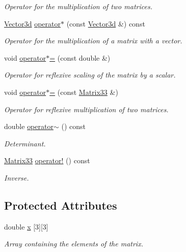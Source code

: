 \begin{DoxyCompactItemize}
\begin{DoxyCompactList}\small\item\em \-Operator for the multiplication of two matrices. \end{DoxyCompactList}\item 
\hyperlink{classVector3d}{\-Vector3d} \hyperlink{classMatrix33_a601584a1edbaae7c6a2a2874605d6f61}{operator$\ast$} (const \hyperlink{classVector3d}{\-Vector3d} \&) const 
\begin{DoxyCompactList}\small\item\em \-Operator for the multiplication of a matrix with a vector. \end{DoxyCompactList}\item 
void \hyperlink{classMatrix33_a83162791813bef030b1ceb5df3c5cae3}{operator$\ast$=} (const double \&)
\begin{DoxyCompactList}\small\item\em \-Operator for reflexive scaling of the matrix by a scalar. \end{DoxyCompactList}\item 
void \hyperlink{classMatrix33_ac3937bdeb034cc83b4adcad16cd58a26}{operator$\ast$=} (const \hyperlink{classMatrix33}{\-Matrix33} \&)
\begin{DoxyCompactList}\small\item\em \-Operator for reflexive multiplication of two matrices. \end{DoxyCompactList}\item 
double \hyperlink{classMatrix33_a15b37caa6ab0d9f4a9f0d95846abd675}{operator$\sim$} () const 
\begin{DoxyCompactList}\small\item\em \-Determinant. \end{DoxyCompactList}\item 
\hyperlink{classMatrix33}{\-Matrix33} \hyperlink{classMatrix33_a1b822a20343a26b3c9bb7fd5c1247f37}{operator!} () const 
\begin{DoxyCompactList}\small\item\em \-Inverse. \end{DoxyCompactList}\end{DoxyCompactItemize}
\subsection*{\-Protected \-Attributes}
\begin{DoxyCompactItemize}
\item 
double \hyperlink{classMatrix33_af7f01fa466616eb7c8eda2e4d9f85cdd}{x} \mbox{[}3\mbox{]}\mbox{[}3\mbox{]}
\begin{DoxyCompactList}\small\item\em \-Array containing the elements of the matrix. \end{DoxyCompactList}\end{DoxyCompactItemize}


